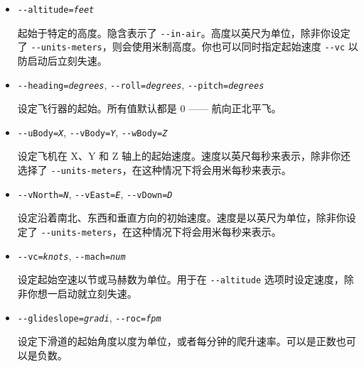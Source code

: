 {\begin{itemize}
  起始于特定的经度和纬度，以十进制角度表示（西经和南纬用复数）。

\item{\texttt{-$ $-altitude={\it feet}}}

 起始于特定的高度。隐含表示了 \texttt{-$ $-in-air}。高度以英尺为单位，除非你设定了 \texttt{-$ $-units-meters}，则会使用米制高度。你也可以同时指定起始速度 \texttt{-$ $-vc} 以防启动后立刻失速。

\item{\texttt{-$ $-heading={\it degrees}}, \texttt{-$ $-roll={\it degrees}}, \texttt{-$ $-pitch={\it degrees}}}

设定飞行器的起始。所有值默认都是 0 —— 航向正北平飞。

\item{\texttt{-$ $-uBody={\it X}}, \texttt{-$ $-vBody={\it Y}}, \texttt{-$ $-wBody={\it Z}}}

设定飞机在 X、Y 和 Z 轴上的起始速度。速度以英尺每秒来表示，除非你还选择了 \texttt{-$ $-units-meters}，在这种情况下将会用米每秒来表示。

\item{\texttt{-$ $-vNorth={\it N}}, \texttt{-$ $-vEast={\it E}}, \texttt{-$ $-vDown={\it D}}}

设定沿着南北、东西和垂直方向的初始速度。速度是以英尺为单位，除非你设定了 \texttt{-$ $-units-meters}，在这种情况下将会用米每秒来表示。

\item{\texttt{-$ $-vc={\it knots}}, \texttt{-$ $-mach={\it num}}}

设定起始空速以节或马赫数为单位。用于在 \texttt{-$ $-altitude} 选项时设定速度，除非你想一启动就立刻失速。

\item{\texttt{-$ $-glideslope={\it gradi}}, \texttt{-$ $-roc={\it fpm}}}

设定下滑道的起始角度以度为单位，或者每分钟的爬升速率。可以是正数也可以是负数。

 \end{itemize}

}
\fi


